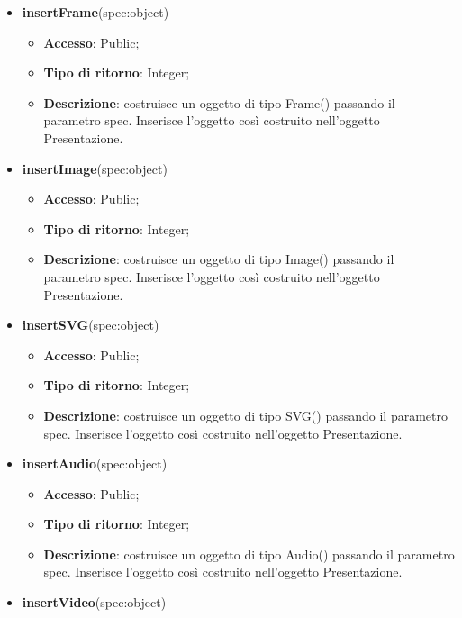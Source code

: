 {\begin{itemize}
\begin{itemize}
				\item \textbf{Descrizione}: costruisce un oggetto di tipo Text() passando il parametro spec. Inserisce l’oggetto così costruito nell’oggetto Presentazione.
			\end{itemize}
			\item \textbf{insertFrame}(spec:object)
			\begin{itemize}
				\item \textbf{Accesso}: Public;
				\item \textbf{Tipo di ritorno}: Integer;
				\item \textbf{Descrizione}: costruisce un oggetto di tipo Frame() passando il parametro spec. Inserisce l’oggetto così costruito nell’oggetto Presentazione.
			\end{itemize}
			\item \textbf{insertImage}(spec:object)
			\begin{itemize}
				\item \textbf{Accesso}: Public;
				\item \textbf{Tipo di ritorno}: Integer;
				\item \textbf{Descrizione}: costruisce un oggetto di tipo Image() passando il parametro spec. Inserisce l’oggetto così costruito nell’oggetto Presentazione.
			\end{itemize}
			\item \textbf{insertSVG}(spec:object)
			\begin{itemize}
				\item \textbf{Accesso}: Public;
				\item \textbf{Tipo di ritorno}: Integer;
				\item \textbf{Descrizione}: costruisce un oggetto di tipo SVG() passando il parametro spec. Inserisce l’oggetto così costruito nell’oggetto Presentazione.
			\end{itemize}
			\item \textbf{insertAudio}(spec:object)
			\begin{itemize}
				\item \textbf{Accesso}: Public;
				\item \textbf{Tipo di ritorno}: Integer;
				\item \textbf{Descrizione}: costruisce un oggetto di tipo Audio() passando il parametro spec. Inserisce l’oggetto così costruito nell’oggetto Presentazione.
			\end{itemize}
			\item \textbf{insertVideo}(spec:object)
			\begin{itemize}

\end{itemize}
\end{itemize}}

